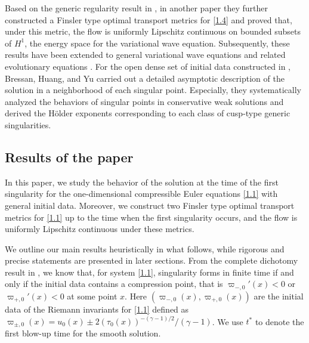 \documentclass[11pt,reqno]{article}
\numberwithin{equation}{section}
\begin{document}
Based on the generic regularity result in \cite{BC1}, in another paper \cite{BC2} they further constructed a Finsler type optimal transport metrics for \eqref{1.4} and proved that, under this metric, the flow is uniformly Lipschitz continuous on bounded subsets of $H^1$, the energy space for the variational wave equation. Subsequently, these results have been extended to general variational wave equations and related evolutionary equations \cite{CCS1, CCS2, CCCS}. For the open dense set of initial data constructed in \cite{BC1}, Bressan, Huang, and Yu \cite{BHY} carried out a detailed asymptotic description of the solution in a neighborhood of each singular point. Especially, they systematically analyzed the behaviors of singular points in conservative weak solutions and
derived the H\"older exponents corresponding to each class of cusp-type generic singularities.




\subsection{Results of the paper}\label{S12}

In this paper, we study the behavior of the solution at the time of the first singularity
for the one-dimensional compressible Euler equations \eqref{1.1} with
general initial data. Moreover, we construct two Finsler type optimal transport metrics for \eqref{1.1} up to the time when the first singularity occurs, and the flow is uniformly Lipschitz continuous under these metrics.

We outline our main results heuristically in what follows, while rigorous and precise statements are presented in later sections. From the complete dichotomy result in \cite{Lax,Chen3, Chen4}, we know that, for system \eqref{1.1}, singularity forms in finite time if and only if the initial data contains a compression point, that is $\varpi_{-,0}'(x)<0$ or $\varpi_{+,0}'(x)<0$ at some point $x$. Here $(\varpi_{-,0}(x), \varpi_{+,0}(x))$ are the initial data of the  Riemann invariants for \eqref{1.1} defined as $\varpi_{\pm,0}(x)=u_0(x)\pm 2(\tau_0(x))^{-(\gamma-1)/2}/(\gamma-1)$. We use $t^*$ to denote the first blow-up time for the smooth solution.
\end{document}
